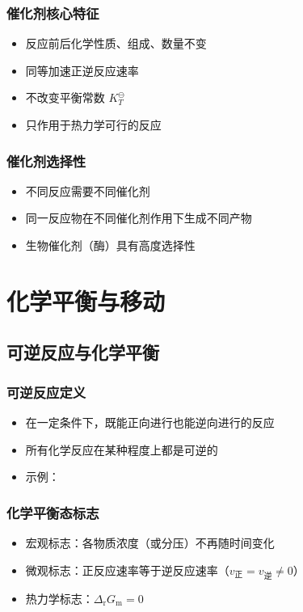 \subsubsection{催化剂核心特征}
\begin{itemize}
\item 反应前后化学性质、组成、数量不变
\item 同等加速正逆反应速率
\item 不改变平衡常数 $K_T^\ominus$
\item 只作用于热力学可行的反应
\end{itemize}

\subsubsection{催化剂选择性}
\begin{itemize}
\item 不同反应需要不同催化剂
\item 同一反应物在不同催化剂作用下生成不同产物
\item 生物催化剂（酶）具有高度选择性
\end{itemize}

\section{化学平衡与移动}
\subsection{可逆反应与化学平衡}
\subsubsection{可逆反应定义}
\begin{itemize}
\item 在一定条件下，既能正向进行也能逆向进行的反应
\item 所有化学反应在某种程度上都是可逆的
\item 示例：
\end{itemize}

\subsubsection{化学平衡态标志}
\begin{itemize}
\item 宏观标志：各物质浓度（或分压）不再随时间变化
\item 微观标志：正反应速率等于逆反应速率（$v_{\text{正}} = v_{\text{逆}} \neq 0$）
\item 热力学标志：$\Delta_{\text{r}} G_{\text{m}} = 0$
\end{itemize}


